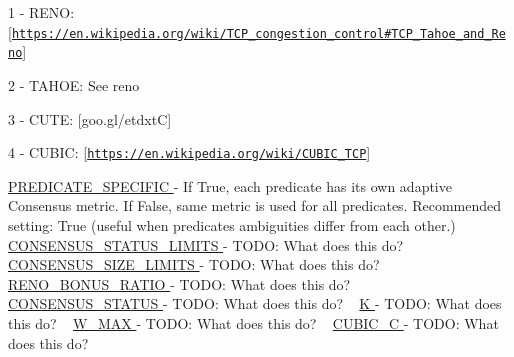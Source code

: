 \begin{DoxyItemize}
\item 1 -\/ R\+E\+NO\+: \mbox{[}\href{https://en.wikipedia.org/wiki/TCP_congestion_control#TCP_Tahoe_and_Reno}{\tt https\+://en.\+wikipedia.\+org/wiki/\+T\+C\+P\+\_\+congestion\+\_\+control\#\+T\+C\+P\+\_\+\+Tahoe\+\_\+and\+\_\+\+Reno}\mbox{]}
\item 2 -\/ T\+A\+H\+OE\+: See reno
\item 3 -\/ C\+U\+TE\+: \mbox{[}goo.\+gl/etdxtC\mbox{]}
\item 4 -\/ C\+U\+B\+IC\+: \mbox{[}\href{https://en.wikipedia.org/wiki/CUBIC_TCP}{\tt https\+://en.\+wikipedia.\+org/wiki/\+C\+U\+B\+I\+C\+\_\+\+T\+CP}\mbox{]}
\end{DoxyItemize}

\hyperlink{namespacedynamicfilterapp_1_1toggles_a2826a54e707f46fbd0fa2f8f6219ead7}{P\+R\+E\+D\+I\+C\+A\+T\+E\+\_\+\+S\+P\+E\+C\+I\+F\+IC } -\/ If True, each predicate has its own adaptive Consensus metric. If False, same metric is used for all predicates. Recommended setting\+: True (useful when predicates\textquotesingle{} ambiguities differ from each other.) ~\newline
 \hyperlink{namespacedynamicfilterapp_1_1toggles_a36cac18f3d673a6f2cd86c88127e41b9}{C\+O\+N\+S\+E\+N\+S\+U\+S\+\_\+\+S\+T\+A\+T\+U\+S\+\_\+\+L\+I\+M\+I\+TS } -\/ T\+O\+DO\+: What does this do? ~\newline
 \hyperlink{namespacedynamicfilterapp_1_1toggles_a1a20e4a8af9569eaef5eb5b23f07222b}{C\+O\+N\+S\+E\+N\+S\+U\+S\+\_\+\+S\+I\+Z\+E\+\_\+\+L\+I\+M\+I\+TS } -\/ T\+O\+DO\+: What does this do? ~\newline
 \hyperlink{namespacedynamicfilterapp_1_1toggles_a18fd240c30a7c4a6ee9df12436a744ab}{R\+E\+N\+O\+\_\+\+B\+O\+N\+U\+S\+\_\+\+R\+A\+T\+IO } -\/ T\+O\+DO\+: What does this do? ~\newline
 \hyperlink{namespacedynamicfilterapp_1_1toggles_a090eab76b7b0e234f422b87e30adf793}{C\+O\+N\+S\+E\+N\+S\+U\+S\+\_\+\+S\+T\+A\+T\+US } -\/ T\+O\+DO\+: What does this do? ~\newline
 \hyperlink{namespacedynamicfilterapp_1_1toggles_a2689c4b3931025b79053532a5f1b0a85}{K } -\/ T\+O\+DO\+: What does this do? ~\newline
 \hyperlink{namespacedynamicfilterapp_1_1toggles_add63171ca968cbd5ca4d60dfbf9a2746}{W\+\_\+\+M\+AX } -\/ T\+O\+DO\+: What does this do? ~\newline
 \hyperlink{namespacedynamicfilterapp_1_1toggles_a073a7aa1bc6b8c92d5682922759765fd}{C\+U\+B\+I\+C\+\_\+C } -\/ T\+O\+DO\+: What does this do? ~\newline
